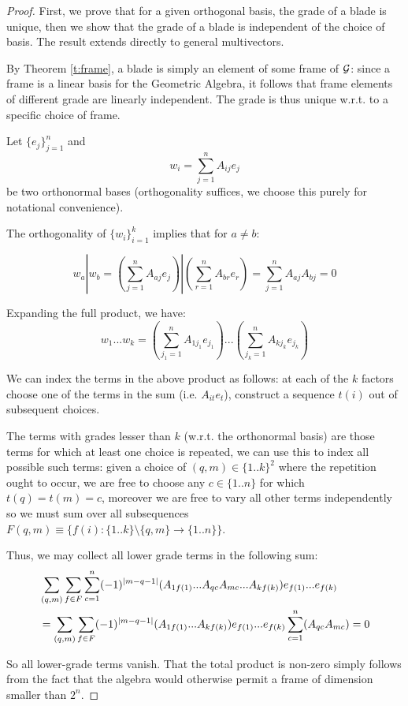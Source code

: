 \begin{proof}
	First, we prove that for a given orthogonal basis, the grade of a blade is unique, then we show that the grade of a blade is independent of the choice of basis. The result extends directly to general multivectors.

	By Theorem \ref{t:frame}, a blade is simply an element of some frame of $\mathcal{G}$: since a frame is a linear basis for the Geometric Algebra, it follows that frame elements of different grade are linearly independent. The grade is thus unique w.r.t. to a specific choice of frame.


	Let $\{e_j\}_{j=1}^n$ and \[w_i = \sum_{j=1}^n A_{ij} e_j\] be two orthonormal bases (orthogonality suffices, we choose this purely for notational convenience).
	

	The orthogonality of $\{w_i\}_{i=1}^k$ implies that for $a \neq b$:
		
	\[w_a|w_b = (\sum_{j=1}^n A_{aj} e_j)|(\sum_{r=1}^n A_{br} e_r) = \sum_{j=1}^n A_{aj}A_{bj} = 0\]

	Expanding the full product, we have:
	\[w_1...w_k = (\sum_{j_1=1}^n A_{1{j_1}}e_{j_1})...(\sum_{j_k=1}^n A_{k{j_k}}e_{j_k})\]

	We can index the terms in the above product as follows: at each of the $k$ factors choose one of the terms in the sum (i.e. $A_{it} e_t$), construct a sequence $t(i)$ out of subsequent choices.

	The terms with grades lesser than $k$ (w.r.t. the orthonormal basis) are those terms for which at least one choice is repeated, we can use this to index all possible such terms: given a choice of $(q, m) \in \{1..k\}^2$ where the repetition ought to occur, we are free to choose any $c \in \{1..n\}$ for which $t(q) = t(m) = c$, moreover we are free to vary all other terms independently so we must sum over all subsequences $F(q,m) \equiv \{f(i): \{1..k\}\setminus\{q,m\} \to \{1..n\}\}$. 

	Thus, we may collect all lower grade terms in the following sum:
	\begin{align*}
		&\sum_{(q,m)} \sum_{f \in F} \sum_{c=1}^n (-1)^{\left|m-q-1\right|}(A_{1f(1)}...A_{qc}A_{mc}...A_{kf(k)})e_{f(1)}...e_{f(k)} \\
	&= \sum_{(q,m)} \sum_{f \in F} (-1)^{\left|m-q-1\right|}(A_{1f(1)}...A_{kf(k)})e_{f(1)}...e_{f(k)} \sum_{c=1}^n (A_{qc}A_{mc}) = 0
	\end{align*}
	
	So all lower-grade terms vanish. That the total product is non-zero simply follows from the fact that the algebra would otherwise permit a frame of dimension smaller than $2^n$.
\end{proof}
